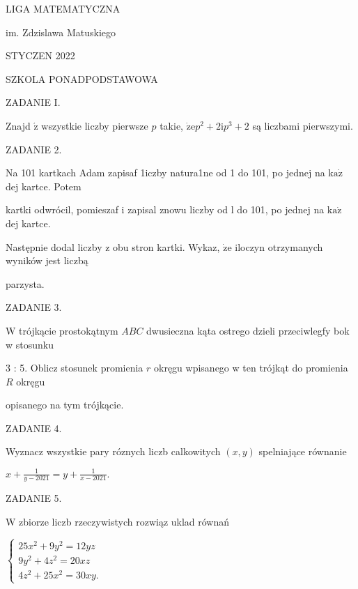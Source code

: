 \documentclass[a4paper,12pt]{article}
\begin{document}
LIGA MATEMATYCZNA

im. Zdzislawa Matuskiego

STYCZEN 2022

SZKOLA PONADPODSTAWOWA

ZADANIE I.

Znajd $\acute{\mathrm{z}}$ wszystkie liczby pierwsze $p$ takie, $\dot{\mathrm{z}}\mathrm{e}p^{2}+2\mathrm{i}p^{3}+2$ są liczbami pierwszymi.

ZADANIE 2.

Na 101 kartkach Adam zapisaf 1iczby natura1ne od 1 do 101, po jednej na $\mathrm{k}\mathrm{a}\dot{\mathrm{z}}$ dej kartce. Potem

kartki odwrócil, pomieszaf i zapisal znowu liczby od l do 101, po jednej na $\mathrm{k}\mathrm{a}\dot{\mathrm{z}}$ dej kartce.

Następnie dodal liczby z obu stron kartki. Wykaz, $\dot{\mathrm{z}}\mathrm{e}$ iloczyn otrzymanych wyników jest liczbą

parzysta.

ZADANIE 3.

$\mathrm{W}$ trójkącie prostokątnym $ABC$ dwusieczna kąta ostrego dzieli przeciwlegfy bok w stosunku

3 : 5. Oblicz stosunek promienia $r$ okręgu wpisanego w ten trójkąt do promienia $R$ okręgu

opisanego na tym trójkącie.

ZADANIE 4.

Wyznacz wszystkie pary róznych liczb calkowitych $(x,y)$ spelniające równanie

$x+\displaystyle \frac{1}{y-2021}=y+\frac{1}{x-2021}.$

ZADANIE 5.

$\mathrm{W}$ zbiorze liczb rzeczywistych rozwiąz uklad równań

$\left\{\begin{array}{l}
25x^{2}+9y^{2}=12yz\\
9y^{2}+4z^{2}=20xz\\
4z^{2}+25x^{2}=30xy.
\end{array}\right.$
\end{document}
